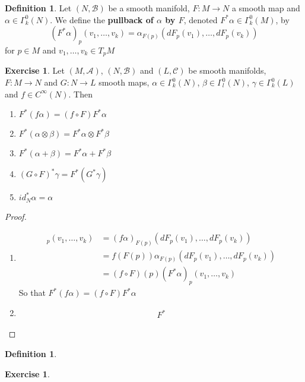 \documentclass{book}
\theoremstyle{definition}
\newtheorem{defn}[definition]{Definition}
\newtheorem{ex}[definition]{Exercise}
\newcommand{\al}{\alpha}
\newcommand{\be}{\beta}
\newcommand{\gam}{\gamma}
\newcommand{\Gam}{\Gamma}
\newcommand{\MA}{\mathcal{A}}
\newcommand{\MB}{\mathcal{B}}
\newcommand{\MC}{\mathcal{C}}
\DeclareMathOperator*{\0}{\mbf{0}}
\DeclareMathOperator*{\1}{\mbf{1}}
\newcommand{\tbf}[1]{\textbf{#1}}
\begin{document}
	\begin{defn}
	Let $(N, \MB)$ be a smooth manifold, $F:M \rightarrow N$ a smooth map and $\al \in \Gam^0_k(N)$. We define the \tbf{pullback of $\al$ by $F$}, denoted $F^*\al \in \Gam^0_k(M)$, by  $$(F^*\al)_p(v_1, \dots, v_k) = \al_{F(p)} (dF_p(v_1), \dots, dF_p(v_k))$$ for $p \in M$ and $v_1, \dots, v_k \in T_pM$
	\end{defn}

	\begin{ex}
	Let $(M, \MA)$, $(N, \MB)$ and $(L, \MC)$ be smooth manifolds, $F:M \rightarrow N$ and $G:N \rightarrow L$ smooth maps, $\al \in \Gam^0_k(N)$, $\be  \in \Gam^0_l(N)$, $\gam \in \Gam^0_k(L)$ and $f \in C^{\infty}(N)$. Then 
	\begin{enumerate}
	\item $F^*(f \al) = (f \circ F) F^* \al$
	\item $F^*(\al \otimes \be) = F^*\al \otimes F^* \be$
	\item $F^*(\al + \be) = F^* \al + F^* \be $
	\item $(G \circ F)^*\gam = F^*(G^* \gam)$
	\item $id_N^* \al = \al$
	\end{enumerate}
	\end{ex}
	
	\begin{proof}\
	\begin{enumerate}
	\item 
	\begin{align*}
	[F^*(f \al)]_p(v_1, \dots, v_k) 
	&= (f \al )_{F(p)}(dF_p(v_1), \dots, dF_p(v_k)) \\
	&= f (F(p)) \al_{F(p)} (dF_p(v_1), \dots, dF_p(v_k)) \\
	&= (f \circ F)(p) (F^*\al)_p(v_1, \dots, v_k)
	\end{align*}
	So that $F^*(f \al) = (f \circ F) F^* \al$
	\item 
	\begin{align*}
		F^*
	\end{align*}
	\end{enumerate}
	
	\end{proof}
	
	
	
	
	
	\begin{defn}
	
	\end{defn}

	
	\begin{ex}
	
	\end{ex}
	
\end{document}
